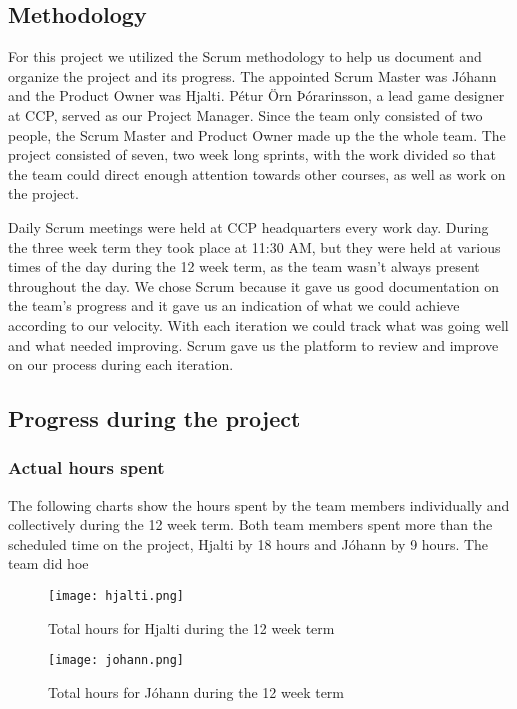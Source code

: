 \subsection{Methodology}
For this project we utilized the Scrum methodology to help us document and organize the project and its progress. The appointed Scrum Master was Jóhann and the Product Owner was Hjalti. Pétur Örn Þórarinsson, a lead game designer at CCP, served as our Project Manager. Since the team only consisted of two people, the Scrum Master and Product Owner made up the the whole team. The project consisted of seven, two week long sprints, with the work divided so that the team could direct enough attention towards other courses, as well as work on the project.

Daily Scrum meetings were held at CCP headquarters every work day. During the three week term they took place at 11:30 AM, but they were held at various times of the day during the 12 week term, as the team wasn't always present throughout the day. We chose Scrum because it gave us good documentation on the team's progress and it gave us an indication of what we could achieve according to our velocity. With each iteration we could track what was going well and what needed improving. Scrum gave us the platform to review and improve on our process during each iteration.

\subsection{Progress during the project}

\subsubsection{Actual hours spent}

The following charts show the hours spent by the team members individually and collectively during the 12 week term. Both team members spent more than the scheduled time on the project, Hjalti by 18 hours and Jóhann by 9 hours. The team did hoe

\begin{figure}[H]
  \centering
  \graphicspath{ {./graphics/} }
  \centerline{\texttt{[image: hjalti.png]}}
  \caption{\label{fig:hjalti}Total hours for Hjalti during the 12 week term}
\end{figure}

\begin{figure}[H]
  \centering
  \graphicspath{ {./graphics/} }
  \centerline{\texttt{[image: johann.png]}}
  \caption{\label{fig:johann}Total hours for Jóhann during the 12 week term}
\end{figure}

